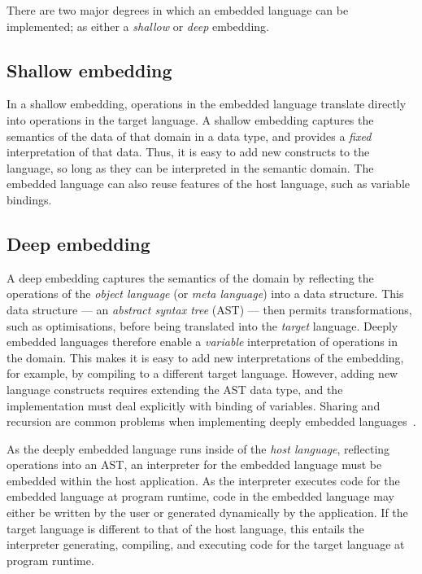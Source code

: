 There are two major degrees in which an embedded language can be implemented; as
either a \emph{shallow} or \emph{deep} embedding.

\subsection{Shallow embedding}

In a shallow embedding, operations in the embedded language translate directly
into operations in the target language. A shallow embedding captures the
semantics of the data of that domain in a data type, and provides a \emph{fixed}
interpretation of that data. Thus, it is easy to add new constructs to the
language, so long as they can be interpreted in the semantic domain. The
embedded language can also reuse features of the host language, such as variable
bindings.


\subsection{Deep embedding}

A deep embedding captures the semantics of the domain by reflecting the
operations of the \emph{object language}\lang[object]{} (or \emph{meta
language}) into a data structure. This data
structure --- an \emph{abstract syntax tree} (AST\AST) --- then permits
transformations, such as optimisations, before being translated into the
\emph{target} language. Deeply embedded languages therefore enable a
\emph{variable} interpretation of operations in the domain. This makes it is
easy to add new interpretations of the embedding, for example, by compiling to a
different target language. However, adding new language constructs requires
extending the AST data type, and the implementation must deal explicitly with
binding of variables. Sharing and recursion are common problems when
implementing deeply embedded languages~\cite{Gill:2009dx}.

As the deeply embedded language\lang[embedded]{} runs inside of the \emph{host
language}\lang[host]{}, reflecting operations into an AST\AST{}, an interpreter
for the embedded language must be embedded within the host application.
As the interpreter executes code for the embedded language at program runtime,
code in the embedded language may either be written by the user or generated
dynamically by the application. If the target language is different to that of
the host language, this entails the interpreter generating, compiling, and
executing code for the target language at program runtime.


